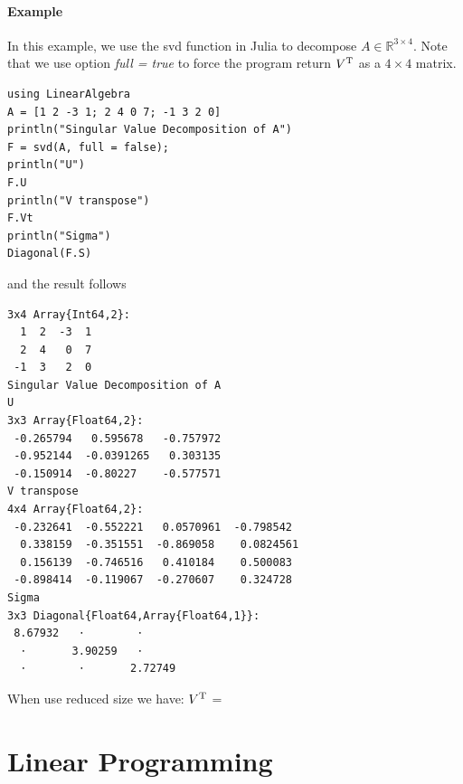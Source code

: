 \documentclass[letterpaper, 11pt]{article}
\providecommand{\nums}[2]{\ensuremath{\mathbb{#1}^{#2}}}
\providecommand{\trans}[1]{\ensuremath{{#1}^{\rm T}}}
\numberwithin{equation}{section}
\begin{document}
\paragraph{Example}
\label{sec:org0b0c42b}
In this example, we use the svd function in Julia to decompose \(A \in \nums{R}{3 \times 4}\). Note that we use option \textit{full = true} to force the
program return \trans{V} as a \(4 \times 4\) matrix.
\begin{verbatim}
using LinearAlgebra
A = [1 2 -3 1; 2 4 0 7; -1 3 2 0]
println("Singular Value Decomposition of A")
F = svd(A, full = false);
println("U")
F.U
println("V transpose")
F.Vt
println("Sigma")
Diagonal(F.S)
\end{verbatim}
and the result follows
\begin{verbatim}
3x4 Array{Int64,2}:
  1  2  -3  1
  2  4   0  7
 -1  3   2  0
Singular Value Decomposition of A
U
3x3 Array{Float64,2}:
 -0.265794   0.595678   -0.757972
 -0.952144  -0.0391265   0.303135
 -0.150914  -0.80227    -0.577571
V transpose
4x4 Array{Float64,2}:
 -0.232641  -0.552221   0.0570961  -0.798542 
  0.338159  -0.351551  -0.869058    0.0824561
  0.156139  -0.746516   0.410184    0.500083 
 -0.898414  -0.119067  -0.270607    0.324728 
Sigma
3x3 Diagonal{Float64,Array{Float64,1}}:
 8.67932   ⋅        ⋅     
  ⋅       3.90259   ⋅     
  ⋅        ⋅       2.72749
\end{verbatim}
When use reduced size we have: 
\trans{V} = \left [
\begin{matrix}
-0.232641 & -0.552221 &  0.0570961 &  -0.798542 \\
 0.338159 & -0.351551 & -0.869058  &  0.0824561 \\
 0.156139 & -0.746516 &  0.410184  &  0.500083  \\
\end{matrix}
\right]
\section{Linear Programming}
\label{sec:org5c7b129}
\end{document}
